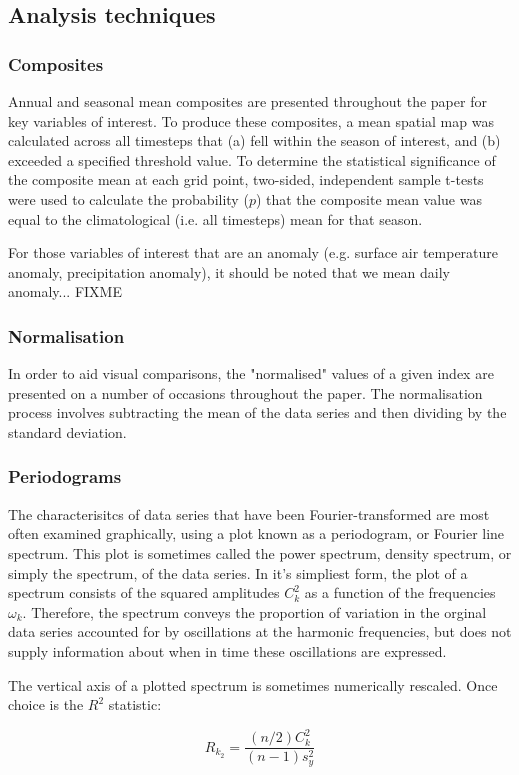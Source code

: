 \subsection{Analysis techniques}

\subsubsection{Composites}
Annual and seasonal mean composites are presented throughout the paper for key variables of interest. To produce these composites, a mean spatial map was calculated across all timesteps that (a) fell within the season of interest, and (b) exceeded a specified threshold value. To determine the statistical significance of the composite mean at each grid point, two-sided, independent sample t-tests were used to calculate the probability ($p$) that the composite mean value was equal to the climatological (i.e. all timesteps) mean for that season.    

For those variables of interest that are an anomaly (e.g. surface air temperature anomaly, precipitation anomaly), it should be noted that we mean daily anomaly... FIXME

\subsubsection{Normalisation}
In order to aid visual comparisons, the "normalised" values of a given index are presented on a number of occasions throughout the paper. The normalisation process involves subtracting the mean of the data series and then dividing by the standard deviation. 

\subsubsection{Periodograms} %
The characterisitcs of data series that have been Fourier-transformed are most often examined graphically, using a plot known as a periodogram, or Fourier line spectrum. This plot is sometimes called the power spectrum, density spectrum, or simply the spectrum, of the data series. In it's simpliest form, the plot of a spectrum consists of the squared amplitudes $C_k^2$ as a function of the frequencies $\omega_k$. Therefore, the spectrum conveys the proportion of variation in the orginal data series accounted for by oscillations at the harmonic frequencies, but does not supply information about when in time these oscillations are expressed.

The vertical axis of a plotted spectrum is sometimes numerically rescaled. Once choice is the $R^2$ statistic:

\begin{equation}
R_k_2 = \frac{(n/2)C_k^2}{(n-1)s_y^2}
\end{equation}